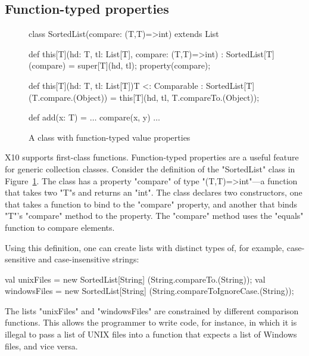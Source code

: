 \documentclass[preprint,nocopyrightspace,9pt]{sigplanconf}
\begin{document}
\subsection{Function-typed properties}

\begin{figure}

\begin{xtenmathnoindent}
class SortedList(compare: (T,T)=>int) extends List {
    def this[T](hd: T, tl: List[T],
                compare: (T,T)=>int)
        : SortedList[T](compare) = {
        super[T](hd, tl);
        property(compare);
    }

    def this[T](hd: T, tl: List[T]){T <: Comparable}
        : SortedList[T](T.compare.(Object)) = {
        this[T](hd, tl, T.compareTo.(Object));
    }

    def add(x: T) = {
        $\dots$ compare(x, y) $\dots$
    }
}
\end{xtenmathnoindent}

\caption{A  class with function-typed value properties}
\label{fig:linked}
\end{figure}


X10 supports first-class functions.
Function-typed properties are a useful feature for generic
collection classes.  Consider the definition of the
\xcd"SortedList" class in Figure~\ref{fig:linked}.
The class has a property \xcd"compare" of type
\xcd"(T,T)=>int"---a function that takes two \xcd"T"s and
returns an \xcd"int".  The class declares two constructors,
one that takes a function to bind to the \xcd"compare"
property, and another that binds \xcd"T"'s \xcd"compare" method to
the property.  The \xcd"compare" method uses the \xcd"equals"
function to compare elements. 

Using this definition, one can create lists with distinct types
of, for example, case-sensitive and case-insensitive strings:
\begin{xten}
val unixFiles
  = new SortedList[String]
        (String.compareTo.(String));
val windowsFiles
  = new SortedList[String]
        (String.compareToIgnoreCase.(String));
\end{xten}

\noindent
The lists \xcd"unixFiles" and \xcd"windowsFiles" are constrained
by different comparison functions.  This allows the programmer
to write code, for instance, in which it is illegal to pass a list of UNIX
files into a function that expects a list of Windows files, and
vice versa.
\end{document}
